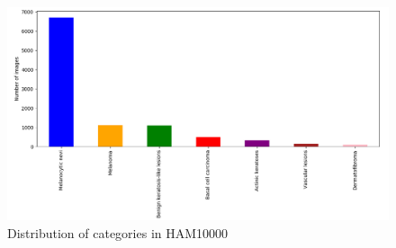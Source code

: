 	\begin{figure}[H]
		\centering
		\includegraphics[width=15cm]{images/graph1.png}
		\caption{Distribution of categories in HAM10000}
		\label{fig:graph1}
	\end{figure}